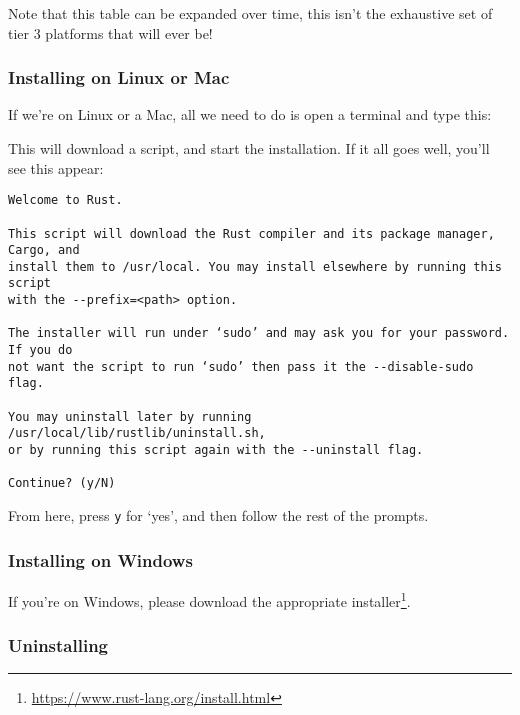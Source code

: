 \documentclass[a4paper,]{book}
\newenvironment{Shaded}{\begin{snugshade}}{\end{snugshade}}
\newcommand{\KeywordTok}[1]{\textcolor[rgb]{0.13,0.29,0.53}{\textbf{{#1}}}}
\newcommand{\NormalTok}[1]{{#1}}
\renewcommand{\href}[2]{#2\footnote{\url{#1}}}
\begin{document}
Note that this table can be expanded over time, this isn't the
exhaustive set of tier 3 platforms that will ever be!

\subsubsection{Installing on Linux or
Mac}\label{installing-on-linux-or-mac}

If we're on Linux or a Mac, all we need to do is open a terminal and
type this:

\begin{Shaded}
\end{Shaded}

This will download a script, and start the installation. If it all goes
well, you'll see this appear:

\begin{verbatim}
Welcome to Rust.

This script will download the Rust compiler and its package manager, Cargo, and
install them to /usr/local. You may install elsewhere by running this script
with the --prefix=<path> option.

The installer will run under ‘sudo’ and may ask you for your password. If you do
not want the script to run ‘sudo’ then pass it the --disable-sudo flag.

You may uninstall later by running /usr/local/lib/rustlib/uninstall.sh,
or by running this script again with the --uninstall flag.

Continue? (y/N)
\end{verbatim}

From here, press \texttt{y} for `yes', and then follow the rest of the
prompts.

\subsubsection{Installing on Windows}\label{installing-on-windows}

If you're on Windows, please download the appropriate
\href{https://www.rust-lang.org/install.html}{installer}.

\subsubsection{Uninstalling}\label{uninstalling}
\end{document}
